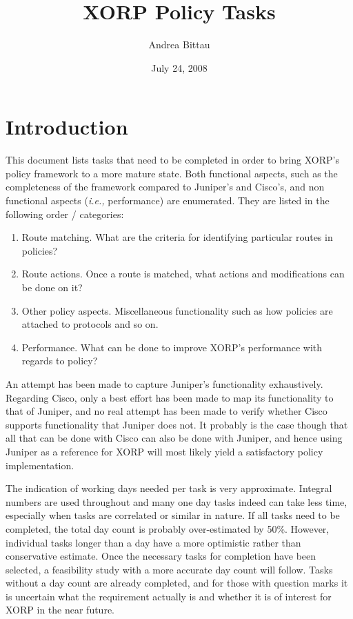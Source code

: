\documentclass[letterpaper]{article}
\author{Andrea Bittau}
\title{XORP Policy Tasks}
\date{July 24, 2008}
\begin{document}
\maketitle

\section{Introduction}
This document lists tasks that need to be completed in order to bring XORP's
policy framework to a more mature state.  Both functional aspects, such as the
completeness of the framework compared to Juniper's and Cisco's, and non
functional aspects ({\em i.e.,} performance) are enumerated.  They are listed in
the following order / categories:
\begin{enumerate}
\item Route matching.  What are the criteria for identifying particular routes
in policies?

\item Route actions.  Once a route is matched, what actions and modifications
can be done on it?

\item Other policy aspects.  Miscellaneous functionality such as how policies
are attached to protocols and so on.

\item Performance.  What can be done to improve XORP's performance with regards
to policy?
\end{enumerate}

An attempt has been made to capture Juniper's functionality exhaustively.
Regarding Cisco, only a best effort has been made to map its functionality to
that of Juniper, and no real attempt has been made to verify whether Cisco
supports functionality that Juniper does not.  It probably is the case though
that all that can be done with Cisco can also be done with Juniper, and hence
using Juniper as a reference for XORP will most likely yield a satisfactory
policy implementation.

The indication of working days needed per task is very approximate.  Integral
numbers are used throughout and many one day tasks indeed can take less time,
especially when tasks are correlated or similar in nature.  If all tasks need to
be completed, the total day count is probably over-estimated by 50\%.  However,
individual tasks longer than a day have a more optimistic rather than
conservative estimate.  Once the necessary tasks for completion have been
selected, a feasibility study with a more accurate day count will follow.  Tasks
without a day count are already completed, and for those with question marks it
is uncertain what the requirement actually is and whether it is of interest for
XORP in the near future.
\end{document}

